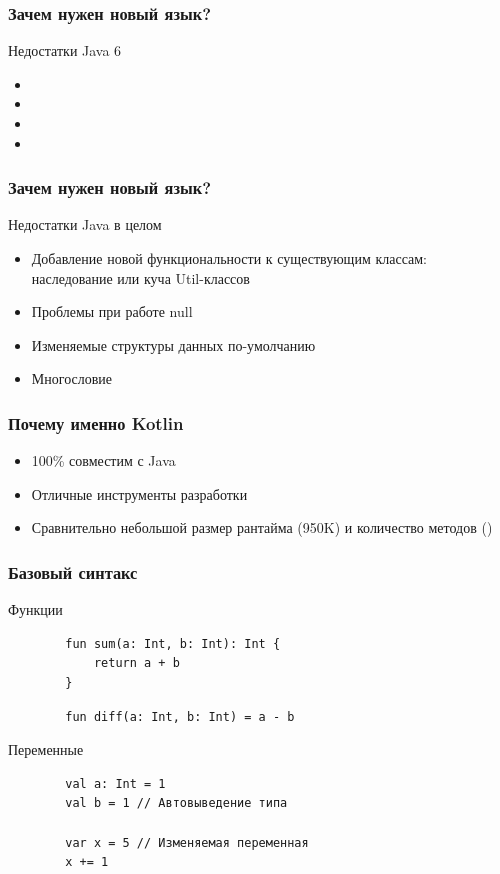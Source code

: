 \documentclass{beamer}
\begin{document}
\begin{frame}
    \frametitle{Зачем нужен новый язык?}
    Недостатки Java 6
    \begin{itemize}
        \item {}
        \item {}
        \item {}
        \item {}
    \end{itemize}
\end{frame}

\begin{frame}
    \frametitle{Зачем нужен новый язык?}
    Недостатки Java в целом
    \begin{itemize}
        \item Добавление новой функциональности к существующим классам:
            наследование или куча Util-классов
        \item Проблемы при работе null
        \item Изменяемые структуры данных по-умолчанию
        \item Многословие
    \end{itemize}
\end{frame}

\begin{frame}
    \frametitle{Почему именно Kotlin}
    \begin{itemize}
        \item 100\% совместим с Java
        \item Отличные инструменты разработки
        \item Сравнительно небольшой размер рантайма (\approx 950K) и количество методов ()
    \end{itemize}
\end{frame}

\begin{frame}[fragile, t]
    \frametitle{Базовый синтакс}
    Функции
    \begin{verbatim}
        fun sum(a: Int, b: Int): Int {
            return a + b
        }
    \end{verbatim}

    \begin{verbatim}
        fun diff(a: Int, b: Int) = a - b
    \end{verbatim}

    Переменные
    \begin{verbatim}
        val a: Int = 1
        val b = 1 // Автовыведение типа

        var x = 5 // Изменяемая переменная
        x += 1
    \end{verbatim}
\end{frame}
\end{document}

